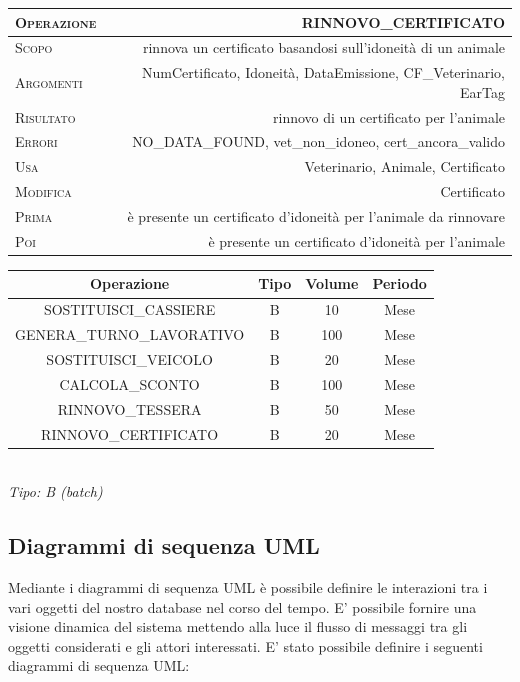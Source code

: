 \documentclass[12pt]{report}
\begin{document}
\begin{itemize}
\begin{center}
 \begin{tabular}{l | r} 
 \textsc{Operazione} & RINNOVO\_CERTIFICATO \\ [0.5ex] 
 \hline
 \textsc{Scopo} & rinnova un certificato basandosi sull'idoneità di un animale\\ 
 \textsc{Argomenti} & NumCertificato, Idoneità, DataEmissione, CF\_Veterinario, EarTag \\
 \textsc{Risultato} & rinnovo di un certificato per l'animale\\
 \textsc{Errori}& NO\_DATA\_FOUND, vet\_non\_idoneo, cert\_ancora\_valido\\
 \textsc{Usa} & Veterinario, Animale, Certificato\\ 
 \textsc{Modifica} & Certificato\\ 
 \textsc{Prima} & è presente un certificato d'idoneità per l'animale da rinnovare\\ 
 \textsc{Poi} & è presente un certificato d'idoneità per l'animale\\ [1ex] 
\end{tabular}
\end{center}

\begin{center}
\begin{tabular}{ |c|c|c|c| }
	 \hline
 		\textbf{Operazione} & \textbf{Tipo} & \textbf{Volume} & \textbf{Periodo}\\
	 	\hline
 		SOSTITUISCI\_CASSIERE & B & 10 & Mese  \\ 
 		\hline
 		GENERA\_TURNO\_LAVORATIVO & B & 100 & Mese  \\ 
 		\hline
 		SOSTITUISCI\_VEICOLO & B & 20 & Mese  \\ 
 		\hline
 		CALCOLA\_SCONTO & B & 100 & Mese  \\ 
 		\hline
 		RINNOVO\_TESSERA & B & 50 & Mese  \\ 
 		\hline
 		RINNOVO\_CERTIFICATO & B & 20 & Mese  \\ 
 		\hline
 \end{tabular}\\
 \textit{Tipo: B (batch)}
\end{center}

\end{itemize}


\subsection{Diagrammi di sequenza UML}
Mediante i diagrammi di sequenza UML è possibile definire le interazioni tra i vari oggetti del nostro database nel corso del tempo. E' possibile fornire una visione dinamica del sistema mettendo alla luce il flusso di messaggi tra gli oggetti considerati e gli attori interessati. E' stato possibile definire i seguenti diagrammi di sequenza UML:
\end{document}
